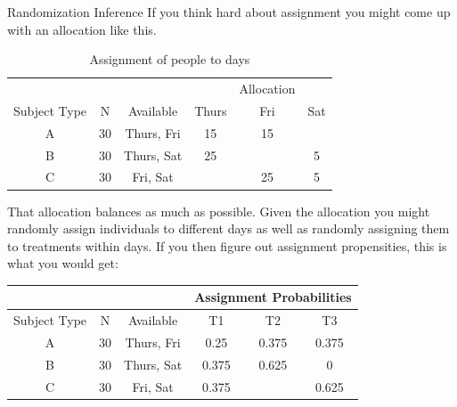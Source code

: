 \documentclass[
  11pt,
  ignorenonframetext,
]{beamer}
\begin{document}
\begin{frame}{Randomization Inference}
\protect\hypertarget{randomization-inference-6}{}
\small If you think hard about assignment you might come up with an
allocation like this.

\begin{table}
  \centering
  \caption{Assignment of people to days}
    \begin{tabular}{ccc|ccc}
          &       &       &       & Allocation &  \\
    Subject Type & N     & Available & Thurs & Fri   & Sat \\ \hline
    A     & 30    & Thurs, Fri & 15    & 15    &  \\
    B     & 30    & Thurs, Sat & 25    &       & 5 \\
    C     & 30    & Fri, Sat &       & 25    & 5 \\
    \end{tabular}
\end{table}

\footnotesize  That allocation balances as much as possible. Given the
allocation you might randomly assign individuals to different days as
well as randomly assigning them to treatments within days. If you then
figure out assignment propensities, this is what you would get:

\begin{table}
  \centering
    \begin{tabular}{cccccc}
          &       &       & \multicolumn{3}{c}{Assignment Probabilities}  \\ \hline
    Subject Type & N     & Available & T1    & T2    & T3 \\ \hline
    A     & 30    & Thurs, Fri & 0.25  & 0.375 & 0.375 \\
    B     & 30    & Thurs, Sat & 0.375 & 0.625 & 0 \\
    C     & 30    & Fri, Sat & 0.375 &       & 0.625 \\ \hline
    \end{tabular}
  
\end{table}
\end{frame}
\end{document}
